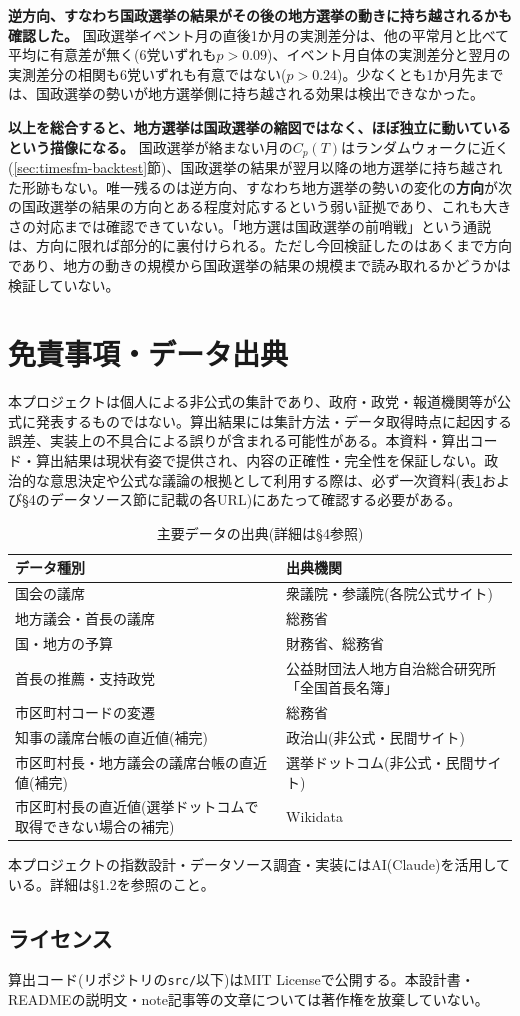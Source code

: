 \documentclass[a4paper,11pt]{ltjsarticle}
\begin{document}
\textbf{逆方向、すなわち国政選挙の結果がその後の地方選挙の動きに持ち越されるかも確認した。} 国政選挙イベント月の直後1か月の実測差分は、他の平常月と比べて平均に有意差が無く(6党いずれも$p>0.09$)、イベント月自体の実測差分と翌月の実測差分の相関も6党いずれも有意ではない($p>0.24$)。少なくとも1か月先までは、国政選挙の勢いが地方選挙側に持ち越される効果は検出できなかった。

\textbf{以上を総合すると、地方選挙は国政選挙の縮図ではなく、ほぼ独立に動いているという描像になる。} 国政選挙が絡まない月の$C_p(T)$はランダムウォークに近く(\ref{sec:timesfm-backtest}節)、国政選挙の結果が翌月以降の地方選挙に持ち越された形跡もない。唯一残るのは逆方向、すなわち地方選挙の勢いの変化の\textbf{方向}が次の国政選挙の結果の方向とある程度対応するという弱い証拠であり、これも大きさの対応までは確認できていない。「地方選は国政選挙の前哨戦」という通説は、方向に限れば部分的に裏付けられる。ただし今回検証したのはあくまで方向であり、地方の動きの規模から国政選挙の結果の規模まで読み取れるかどうかは検証していない。

\section{免責事項・データ出典}

本プロジェクトは個人による非公式の集計であり、政府・政党・報道機関等が公式に発表するものではない。算出結果には集計方法・データ取得時点に起因する誤差、実装上の不具合による誤りが含まれる可能性がある。本資料・算出コード・算出結果は現状有姿で提供され、内容の正確性・完全性を保証しない。政治的な意思決定や公式な議論の根拠として利用する際は、必ず一次資料(表\ref{tab:datasource-recap}および\S4のデータソース節に記載の各URL)にあたって確認する必要がある。

\begin{table}[h]
\centering
\caption{主要データの出典(詳細は\S4参照)}
\label{tab:datasource-recap}
\begin{tabular}{p{9.5cm}p{5.0cm}}
\toprule
データ種別 & 出典機関 \\
\midrule
国会の議席 & 衆議院・参議院(各院公式サイト) \\
地方議会・首長の議席 & 総務省 \\
国・地方の予算 & 財務省、総務省 \\
首長の推薦・支持政党 & 公益財団法人地方自治総合研究所「全国首長名簿」 \\
市区町村コードの変遷 & 総務省 \\
知事の議席台帳の直近値(補完) & 政治山(非公式・民間サイト) \\
市区町村長・地方議会の議席台帳の直近値(補完) & 選挙ドットコム(非公式・民間サイト) \\
市区町村長の直近値(選挙ドットコムで取得できない場合の補完) & Wikidata \\
\bottomrule
\end{tabular}
\end{table}

本プロジェクトの指数設計・データソース調査・実装にはAI(Claude)を活用している。詳細は\S1.2を参照のこと。

\subsection{ライセンス}

算出コード(リポジトリの\texttt{src/}以下)はMIT Licenseで公開する。本設計書・READMEの説明文・note記事等の文章については著作権を放棄していない。
\end{document}
